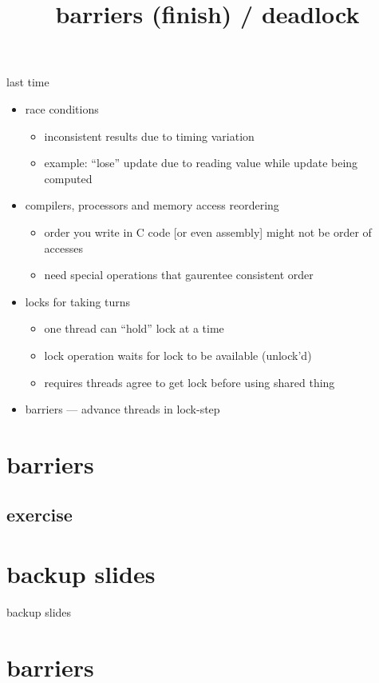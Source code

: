 \date{}
\title{barriers (finish) / deadlock}
\date{}

\begin{frame}
    \titlepage
\end{frame}



\begin{frame}{last time}
    \begin{itemize}
    \item race conditions
        \begin{itemize}
        \item inconsistent results due to timing variation
        \item example: ``lose'' update due to reading value while update being computed
        \end{itemize}
    \item compilers, processors and memory access reordering
        \begin{itemize}
        \item order you write in C code [or even assembly] might not be order of accesses
        \item need special operations that gaurentee consistent order
        \end{itemize}
    \item locks for taking turns
        \begin{itemize}
        \item one thread can ``hold'' lock at a time
        \item lock operation waits for lock to be available (unlock'd)
        \item requires threads agree to get lock before using shared thing
        \end{itemize}
    \item barriers --- advance threads in lock-step
    \end{itemize}
\end{frame}

\section{barriers}
\subsection{exercise}







%

\section{backup slides}
\begin{frame}{backup slides}
\end{frame}
\section{barriers}



